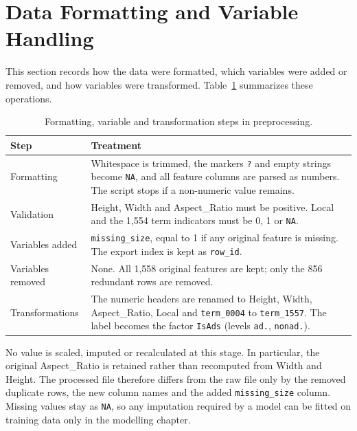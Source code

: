 \section{Data Formatting and Variable Handling}

This section records how the data were formatted, which variables were
added or removed, and how variables were transformed.
Table~\ref{tab:preprocessing-variables} summarizes these operations.

\begin{table}[htbp]
\centering
\caption{Formatting, variable and transformation steps in preprocessing.}
\label{tab:preprocessing-variables}
\small
\begin{tabular}{@{}p{2.9cm}p{11.2cm}@{}}
\toprule
Step & Treatment\\
\midrule
Formatting & Whitespace is trimmed, the markers \texttt{?} and empty
strings become \texttt{NA}, and all feature columns are parsed as numbers.
The script stops if a non-numeric value remains.\\
Validation & Height, Width and Aspect\_Ratio must be positive. Local and
the 1,554 term indicators must be 0, 1 or \texttt{NA}.\\
Variables added & \texttt{missing\_size}, equal to 1 if any original
feature is missing. The export index is kept as \texttt{row\_id}.\\
Variables removed & None. All 1,558 original features are kept; only
the 856 redundant rows are removed.\\
Transformations & The numeric headers are renamed to Height, Width,
Aspect\_Ratio, Local and \texttt{term\_0004} to \texttt{term\_1557}. The
label becomes the factor \texttt{IsAds} (levels \texttt{ad.},
\texttt{nonad.}).\\
\bottomrule
\end{tabular}
\end{table}

No value is scaled, imputed or recalculated at this stage. In particular,
the original Aspect\_Ratio is retained rather than recomputed from Width and
Height. The processed file therefore differs from the raw file only by the
removed duplicate rows, the new column names and the added
\texttt{missing\_size} column. Missing values stay as \texttt{NA}, so any
imputation required by a model can be fitted on training data only in the
modelling chapter.
